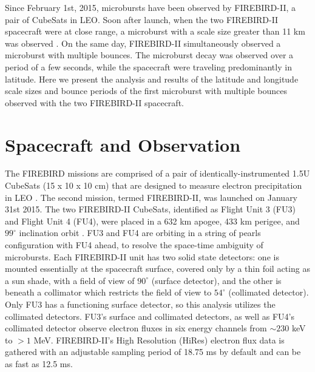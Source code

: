 Since February 1st, 2015, microbursts have been observed by FIREBIRD-II, a pair of CubeSats in LEO. Soon after launch, when the two FIREBIRD-II spacecraft were at close range, a microburst with a scale size greater than 11 km was observed \citep{Crew2016}. On the same day, FIREBIRD-II simultaneously observed a microburst with multiple bounces. The microburst decay was observed over a period of a few seconds, while the spacecraft were traveling predominantly in latitude. Here we present the analysis and results of the latitude and longitude scale sizes and bounce periods of the first microburst with multiple bounces observed with the two FIREBIRD-II spacecraft.

\section{Spacecraft and Observation} \label{obs} %
The FIREBIRD missions are comprised of a pair of identically-instrumented 1.5U CubeSats (15 x 10 x 10 cm) that are designed to measure electron precipitation in LEO \citep{Spence2012, Klumpar2015}. The second mission, termed FIREBIRD-II, was launched on January 31st 2015.  The two FIREBIRD-II CubeSats, identified as Flight Unit 3 (FU3) and Flight Unit 4 (FU4), were placed in a 632 km apogee, 433 km perigee, and $99^{\circ}$ inclination orbit \citep{Crew2016}. FU3 and FU4 are orbiting in a string of pearls configuration with FU4 ahead, to resolve the space-time ambiguity of microbursts. Each FIREBIRD-II unit has two solid state detectors: one is mounted essentially at the spacecraft surface, covered only by a thin foil acting as a sun shade, with a field of view of $90^{\circ}$ (surface detector), and the other is beneath a collimator which restricts the field of view to $54^{\circ}$ (collimated detector). Only FU3 has a functioning surface detector, so this analysis utilizes the collimated detectors. FU3's surface and collimated detectors, as well as FU4's collimated detector observe electron fluxes in six energy channels from $\sim 230$ keV to $> 1$ MeV. FIREBIRD-II's High Resolution (HiRes) electron flux data is gathered with an adjustable sampling period of 18.75 ms by default and can be as fast as 12.5 ms. 

